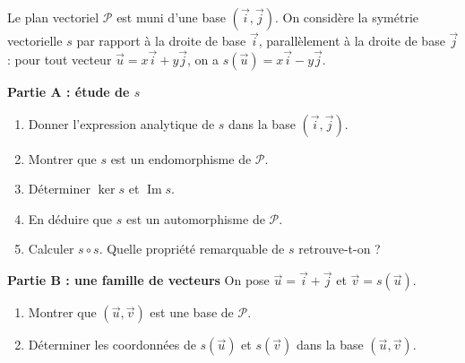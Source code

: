 \documentclass[11pt]{article}
\begin{document}
\begin{exercice}
Le plan vectoriel $\mathcal{P}$ est muni d'une base $(\vec{i},\vec{j})$. On considère la symétrie vectorielle $s$ par rapport à la droite de base $\vec{i}$, parallèlement à la droite de base $\vec{j}$ : pour tout vecteur $\vec{u}=x\vec{i}+y\vec{j}$, on a $s(\vec{u})=x\vec{i}-y\vec{j}$.

\textbf{Partie A : étude de $s$}
\begin{enumerate}
\item Donner l'expression analytique de $s$ dans la base $(\vec{i},\vec{j})$.
\item Montrer que $s$ est un endomorphisme de $\mathcal{P}$.
\item Déterminer $\ker s$ et $\operatorname{Im} s$.
\item En déduire que $s$ est un automorphisme de $\mathcal{P}$.
\item Calculer $s\circ s$. Quelle propriété remarquable de $s$ retrouve-t-on ?
\end{enumerate}

\textbf{Partie B : une famille de vecteurs}
On pose $\vec{u}=\vec{i}+\vec{j}$ et $\vec{v}=s(\vec{u})$.
\begin{enumerate}
\item Montrer que $(\vec{u},\vec{v})$ est une base de $\mathcal{P}$.
\item Déterminer les coordonnées de $s(\vec{u})$ et $s(\vec{v})$ dans la base $(\vec{u},\vec{v})$.
\end{enumerate}
\end{exercice}
\end{document}
